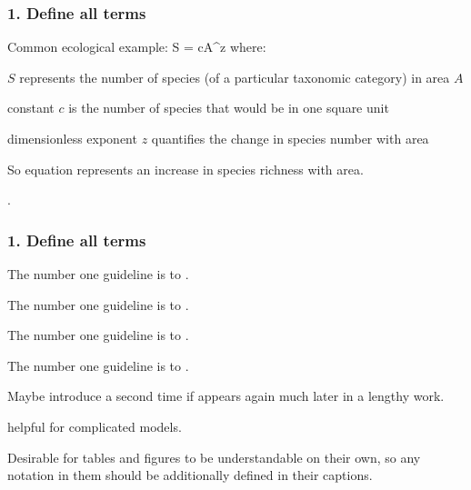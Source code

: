 \begin{frame}
\frametitle{1. Define all terms}
Common ecological example:
\eb
\nonumber S = cA^z
\ee
\pause
where:
\bi
\item $S$ represents the number of species (of a particular taxonomic category)
in area $A$
\item constant $c$ is the
  number of species that would be in one square unit
\item dimensionless exponent $z$ quantifies the change in species number with area
\ei

\pause
So equation represents an increase in species richness with area.

\pause

\medskip

.
\end{frame}


\begin{frame}
\frametitle{1. Define all terms}

The number one guideline is to .

\pause

The number one guideline is to .

\pause

The number one guideline is to .

\pause

The number one guideline is to .

\pause

\medskip

Maybe introduce a second time if appears again much later in a lengthy work.

\medskip

 helpful for complicated models.

\medskip

\pause

Desirable for tables and figures to be understandable on their own, so any
notation in them should be
additionally defined in their captions.


\end{frame}

